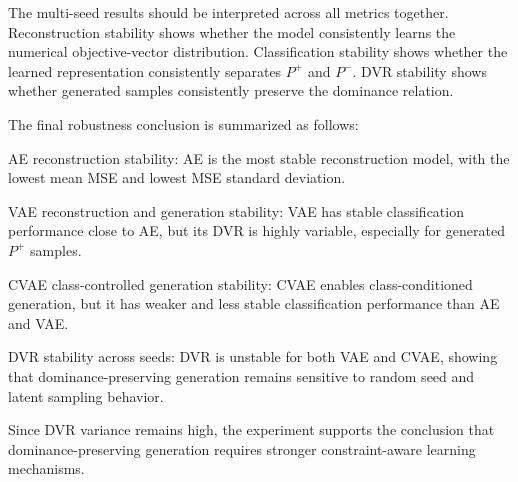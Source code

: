 The multi-seed results should be interpreted across all metrics together. Reconstruction stability shows whether the model consistently learns the numerical objective-vector distribution. Classification stability shows whether the learned representation consistently separates $P^{+}$ and $P^{-}$. DVR stability shows whether generated samples consistently preserve the dominance relation.

The final robustness conclusion is summarized as follows:
\begin{compactitem}
    \item AE reconstruction stability: AE is the most stable reconstruction model, with the lowest mean MSE and lowest MSE standard deviation.
    \item VAE reconstruction and generation stability: VAE has stable classification performance close to AE, but its DVR is highly variable, especially for generated $P^{+}$ samples.
    \item CVAE class-controlled generation stability: CVAE enables class-conditioned generation, but it has weaker and less stable classification performance than AE and VAE.
    \item DVR stability across seeds: DVR is unstable for both VAE and CVAE, showing that dominance-preserving generation remains sensitive to random seed and latent sampling behavior.
\end{compactitem}

Since DVR variance remains high, the experiment supports the conclusion that dominance-preserving generation requires stronger constraint-aware learning mechanisms.